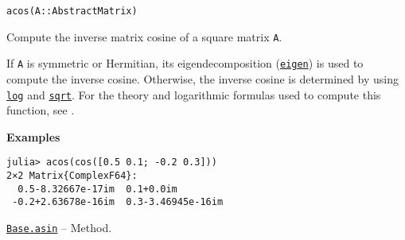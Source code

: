 \begin{adjustwidth}{2em}{0pt}


\begin{verbatim}
acos(A::AbstractMatrix)
\end{verbatim}

Compute the inverse matrix cosine of a square matrix \texttt{A}.

If \texttt{A} is symmetric or Hermitian, its eigendecomposition (\hyperlink{11056016707394839114}{\texttt{eigen}}) is used to compute the inverse cosine. Otherwise, the inverse cosine is determined by using \hyperlink{17317607370922767936}{\texttt{log}} and \hyperlink{4551113327515323898}{\texttt{sqrt}}.  For the theory and logarithmic formulas used to compute this function, see \footnotemark[12].

\textbf{Examples}


\begin{verbatim}
julia> acos(cos([0.5 0.1; -0.2 0.3]))
2×2 Matrix{ComplexF64}:
  0.5-8.32667e-17im  0.1+0.0im
 -0.2+2.63678e-16im  0.3-3.46945e-16im
\end{verbatim}



\end{adjustwidth}
\hypertarget{10573525086108516779}{}
\hyperlink{10573525086108516779}{\texttt{Base.asin}}  -- {Method.}

